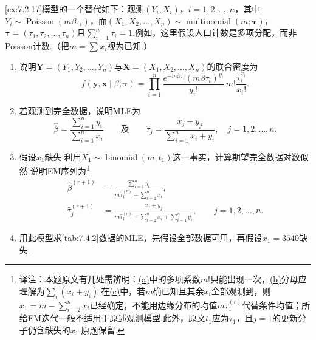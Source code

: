 \begin{exercise}\label{exercise:7.29}
\autoref{ex:7.2.17}模型的一个替代如下：观测$(Y_i,X_i)$，$i=1,2,\ldots,n$，其中$Y_i\sim\operatorname{Poisson}(m\beta\tau_i)$，而$(X_1,X_2,\ldots,X_n)\sim\operatorname{multinomial}(m;\boldsymbol\tau)$，$\boldsymbol\tau=(\tau_1,\tau_2,\ldots,\tau_n)$且$\sum_{i=1}^n\tau_i=1$.例如，这里假设人口计数是多项分配，而非Poisson计数.（把$m=\sum x_i$视为已知.）
\begin{enumerate}[label=(\alph*)]
\item{}\label{itm:exercise:7.29:a} 说明$\boldsymbol Y=(Y_1,Y_2,\ldots,Y_n)$与$\boldsymbol X=(X_1,X_2,\ldots,X_n)$的联合密度为
$$f(\boldsymbol y,\boldsymbol x\mid\beta,\boldsymbol\tau)=\prod_{i=1}^n\frac{e^{-m\beta\tau_i}(m\beta\tau_i)^{y_i}}{y_i!}\,m!\frac{\tau_i^{x_i}}{x_i!}.$$
\item{}\label{itm:exercise:7.29:b} 若观测到完全数据，说明MLE为
$$\widehat\beta=\frac{\sum_{i=1}^ny_i}{\sum_{i=1}^nx_i}\qquad\text{及}\qquad\widehat\tau_j=\frac{x_j+y_j}{\sum_{i=1}^nx_i+y_i},\quad j=1,2,\ldots,n.$$
\item{}\label{itm:exercise:7.29:c} 假设$x_1$缺失.利用$X_1\sim\operatorname{binomial}(m,t_1)$这一事实，计算期望完全数据对数似然.说明EM序列为\footnote{译注：本题原文有几处需辨明：\hyperref[itm:exercise:7.29:a]{(a)}中的多项系数$m!$只能出现一次，\hyperref[itm:exercise:7.29:b]{(b)}分母应理解为$\sum_i(x_i+y_i)$.在\hyperref[itm:exercise:7.29:c]{(c)}中，若$m$确已知且其余$x_i$全部观测到，则$x_1=m-\sum_{i=2}^nx_i$已经确定，不能用边缘分布的均值$m\tau_1^{(r)}$代替条件均值；所给EM迭代一般不适用于原述观测模型.此外，原文$t_1$应为$\tau_1$，且$j=1$的更新分子仍含缺失的$x_1$.原题保留.}
\begin{align*}
\widehat\beta^{(r+1)}&=\frac{\sum_{i=1}^ny_i}{m\widehat\tau_1^{(r)}+\sum_{i=2}^nx_i},\\
\widehat\tau_j^{(r+1)}&=\frac{x_j+y_j}{m\widehat\tau_1^{(r)}+\sum_{i=2}^nx_i+\sum_{i=1}^ny_i},\qquad j=1,2,\ldots,n.
\end{align*}
\item 用此模型求\autoref{tab:7.4.2}数据的MLE，先假设全部数据可用，再假设$x_1=3540$缺失.
\end{enumerate}
\end{exercise}
